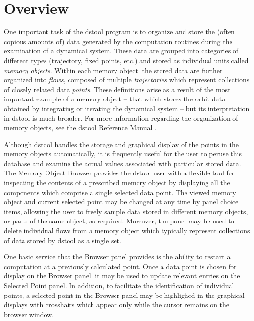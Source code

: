 \section{Overview}

\noindent One important task of the dstool program is to organize and store the 
(often copious amounts of) data generated by the computation routines during the
examination of a dynamical system.  These data are grouped into categories of
different types (trajectory, fixed points, etc.) and stored as individual units
called {\em memory objects}.  Within each memory object,  the stored data are
further organized into {\em flows}, composed of multiple {\em trajectories}
which represent collections of closely related data {\em points}.
These definitions arise as a result of the most important example of a memory
object -- that which stores the orbit data obtained by integrating or iterating
the dynamical system -- but its interpretation in dstool is much broader.
For more information regarding the 
organization of memory objects, see the dstool Reference Manual \cite{gucken1}.
\medskip

\noindent Although dstool handles the storage
and graphical display of the points in the memory objects automatically, it
is frequently useful for the user to peruse this database and examine the actual
values associated with particular stored data.  The Memory Object Browser
provides the dstool user with a flexible tool for inspecting the contents of a
prescribed memory object by displaying all the components which comprise a single
selected data point.  The viewed memory object and current selected point
may be changed at any time by panel choice items, allowing the user to freely 
sample data stored in different memory objects, or parts of the same object, as
required.  Moreover, the panel may be used to delete individual flows from a memory object
which typically represent collections of data stored by dstool as a single set. 
\medskip

\noindent One basic service that the Browser panel provides is the ability to 
restart a computation at a previously calculated point.  Once a data point is 
chosen for display on the Browser panel, it may be used to update relevant entries
on the Selected Point panel.  In addition, to facilitate the 
identification of individual points, a selected point in the Browser panel may be
highlighed in the graphical displays with crosshairs which appear only while the
cursor remains on the browser window.


\newpage
